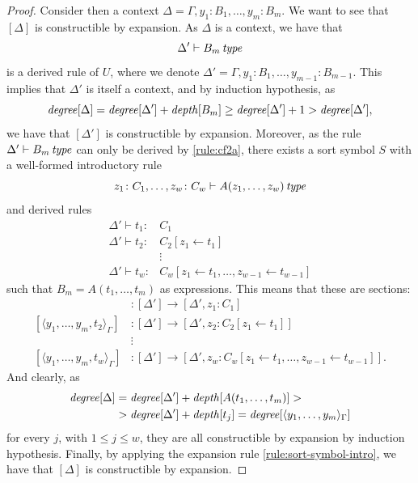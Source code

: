 \begin{proof}
    Consider then a context $\Delta = \Gamma, y_1 \colon B_1, \dots, y_m \colon B_m$. We want to see that $[\Delta]$ is constructible by expansion.
    As $\Delta$ is a context, we have that \[
        \Delta' \vdash B_m \operatorname{\mathit{\space type}}
    \] is a derived rule of $U$, where we denote $\Delta' = \Gamma, y_1 \colon B_1, \dots, y_{m-1} \colon B_{m-1}$. This implies that $\Delta'$ is itself a context, and by induction hypothesis, as \[
        \operatorname{\mathit{degree}}[\Delta] = \operatorname{\mathit{degree}}[\Delta'] + \operatorname{\mathit{depth}}[B_m] \geq \operatorname{\mathit{degree}}[\Delta'] + 1 > \operatorname{\mathit{degree}}[\Delta'],
    \] we have that $[\Delta']$ is constructible by expansion.
    Moreover, as the rule $\Delta' \vdash B_m \operatorname{\mathit{\space type}}$ can only be derived by \ref{rule:cf2a}, there exists a sort symbol $S$
    with a well-formed introductory rule \[
        z_1 \colon C_1, \dots, z_w \colon C_w \vdash A(z_1, \dots, z_w) \operatorname{\mathit{\space type}}
    \] and derived rules
    \begin{align*}
        \Delta' \vdash t_1 \colon& C_1 \\
        \Delta' \vdash t_2 \colon& C_2[z_1  \leftarrow  t_1] \\
        & \vdots \\
        \Delta' \vdash t_w \colon& C_w[z_1  \leftarrow  t_1, \dots, z_{w-1}  \leftarrow  t_{w-1}]
    \end{align*}
    such that $B_m = A(t_1, \dots, t_m)$ as expressions. 
    This means that these are sections:
    \begin{align*}
        [\langle y_1, \dots, y_m, t_1 \rangle_\Gamma] &\colon [\Delta'] \to [\Delta', z_1 \colon C_1] \\
        [\langle y_1, \dots, y_m, t_2 \rangle_\Gamma] &\colon [\Delta'] \to [\Delta', z_2 \colon C_2[z_1  \leftarrow  t_1]] \\
        &\vdots \\
        [\langle y_1, \dots, y_m, t_w \rangle_\Gamma] &\colon [\Delta'] \to [\Delta', z_w \colon C_w[z_1  \leftarrow  t_1, \dots, z_{w-1}  \leftarrow  t_{w-1}]].
    \end{align*}
    And clearly, as \begin{align*}
        \operatorname{\mathit{degree}}[\Delta] &= \operatorname{\mathit{degree}}[\Delta'] + \operatorname{\mathit{depth}}[A(t_1, \dots, t_m)] > \\ 
        &> \operatorname{\mathit{degree}}[\Delta'] + \operatorname{\mathit{depth}}[t_j] = \operatorname{\mathit{degree}}[\langle y_1, \dots, y_m \rangle_\Gamma]
    \end{align*}
    for every $j$, with $1 \leq j \leq w$, they are all constructible by expansion by induction hypothesis.
    Finally, by applying the expansion rule \ref{rule:sort-symbol-intro}, we have that $[\Delta]$ is constructible by expansion.
    

\end{proof}
